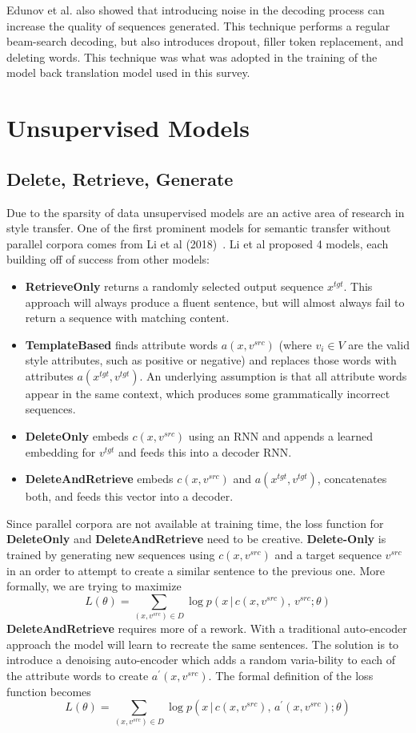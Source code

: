 \documentclass[12pt]{article}
\begin{document}
Edunov et al. also showed that introducing noise in the decoding process can 
increase the quality of sequences generated. This technique performs a regular beam-search decoding, but
also introduces dropout, filler token replacement, and deleting words. This technique 
was what was adopted in the training of the model back translation model used in this survey.
\section{Unsupervised Models}
\subsection{Delete, Retrieve, Generate}
Due to the sparsity of data unsupervised models are an active area of research 
in style transfer. One of the first prominent models for semantic transfer without 
parallel corpora comes from Li et al (2018)~\cite{li2018delete}.
Li et al proposed
4 models, each building off of success from other models:
\begin{itemize}
    \item \textbf{RetrieveOnly} returns a randomly selected output sequence $x^{tgt}$.
    This approach will always produce a fluent sentence, but will almost always fail 
    to return a sequence with matching content. 
    \item \textbf{TemplateBased} finds attribute words $a(x, v^{src})$ (where $v_i \in V$
    are the valid style attributes, such as positive or negative) and replaces those words 
    with attributes $a(x^{tgt}, v^{tgt})$. An underlying assumption is that 
    all attribute words appear in the same context, which produces some grammatically 
    incorrect sequences. 
    \item \textbf{DeleteOnly} embeds $c(x, v^{src})$ using an RNN and appends 
    a learned embedding for $v^{tgt}$ and feeds this into a decoder RNN. 
    \item \textbf{DeleteAndRetrieve} embeds $c(x, v^{src})$ and $a(x^{tgt}, v^{tgt})$,
    concatenates both, and feeds this vector into a decoder.
\end{itemize}
\par
Since parallel corpora are not available at training time, the loss function 
for \textbf{DeleteOnly} and \textbf{DeleteAndRetrieve} need to be creative.
\textbf{Delete-Only} is trained by generating new sequences using $c(x, v^{src})$ 
and a target sequence $v^{src}$ in an order to attempt to create a similar sentence 
to the previous one. More formally, we are trying to maximize
$$ L(\theta) = \sum_{(x, v^{src})\in D} \log p(x \, | \, c(x, v^{src}), \, v^{src}; \theta)$$
\textbf{DeleteAndRetrieve} requires more of a rework. With a traditional auto-encoder 
approach the model will learn to recreate the same sentences. The solution is to
introduce a denoising 
auto-encoder which adds a random varia-bility to each of the attribute
words to create $a^{\prime}(x, v^{src})$. The formal definition of the loss function 
becomes
$$ L(\theta) = \sum_{(x, v^{src})\in D} \log p(x \, | \, c(x, v^{src}), \, a^{\prime}(x, v^{src}); \theta)$$
\end{document}
